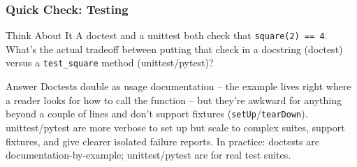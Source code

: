 \begin{frame}[fragile]\frametitle{Quick Check: Testing}
\begin{block}{Think About It}
A doctest and a unittest both check that \lstinline|square(2) == 4|. What's the actual tradeoff
between putting that check in a docstring (doctest) versus a \lstinline|test_square| method
(unittest/pytest)?
\end{block}
\pause
\begin{block}{Answer}
Doctests double as usage documentation -- the example lives right where a reader looks for how
to call the function -- but they're awkward for anything beyond a couple of lines and don't
support fixtures (\texttt{setUp}/\texttt{tearDown}). unittest/pytest are more verbose to set up
but scale to complex suites, support fixtures, and give clearer isolated failure reports. In
practice: doctests are documentation-by-example; unittest/pytest are for real test suites.
\end{block}
\end{frame}
